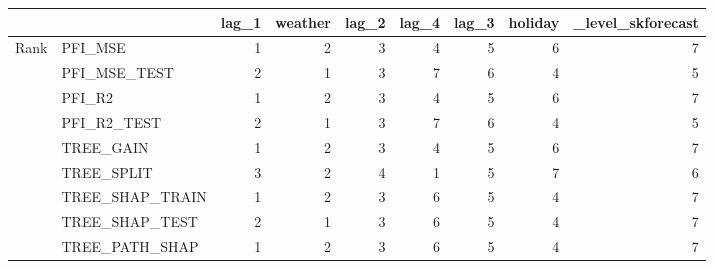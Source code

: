 \begin{tabular}{llrrrrrrr}
\toprule
 &  & lag_1 & weather & lag_2 & lag_4 & lag_3 & holiday & _level_skforecast \\
\midrule
\multirow[t]{9}{*}{Rank} & PFI_MSE & 1 & 2 & 3 & 4 & 5 & 6 & 7 \\
 & PFI_MSE_TEST & 2 & 1 & 3 & 7 & 6 & 4 & 5 \\
 & PFI_R2 & 1 & 2 & 3 & 4 & 5 & 6 & 7 \\
 & PFI_R2_TEST & 2 & 1 & 3 & 7 & 6 & 4 & 5 \\
 & TREE_GAIN & 1 & 2 & 3 & 4 & 5 & 6 & 7 \\
 & TREE_SPLIT & 3 & 2 & 4 & 1 & 5 & 7 & 6 \\
 & TREE_SHAP_TRAIN & 1 & 2 & 3 & 6 & 5 & 4 & 7 \\
 & TREE_SHAP_TEST & 2 & 1 & 3 & 6 & 5 & 4 & 7 \\
 & TREE_PATH_SHAP & 1 & 2 & 3 & 6 & 5 & 4 & 7 \\
\cline{1-9}
\bottomrule
\end{tabular}

